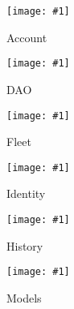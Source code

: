 \documentclass{article}
\newcommand{\diagram}[2]{
	\texttt{[image: \#1]}
	\caption{#2}
}
\newcommand{\vertdiagram}[2]{
	\begin{sidewaysfigure}
		\diagram{#1}{#2}
	\end{sidewaysfigure}
}
\begin{document}
	\vertdiagram{ClassDiagramAccount}{Account}
	\vertdiagram{ClassDiagramDAO}{DAO}
	\vertdiagram{ClassDiagramFleet}{Fleet}
	\vertdiagram{ClassDiagramIdentity}{Identity}
	\vertdiagram{ClassDiagramHistory}{History}
	\vertdiagram{ClassDiagramModels}{Models}
\end{document}
